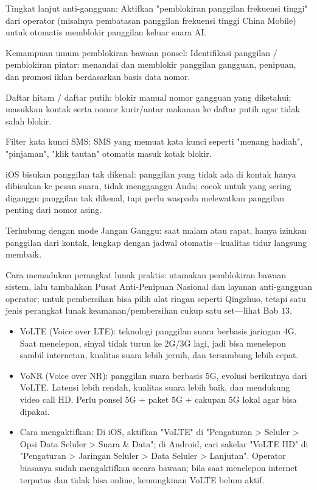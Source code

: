Tingkat lanjut anti-gangguan: Aktifkan "pemblokiran panggilan frekuensi tinggi" dari operator (misalnya pembatasan panggilan frekuensi tinggi China Mobile) untuk otomatis memblokir panggilan keluar suara AI.

Kemampuan umum pemblokiran bawaan ponsel: Identifikasi panggilan / pemblokiran pintar: menandai dan memblokir panggilan gangguan, penipuan, dan promosi iklan berdasarkan basis data nomor.

Daftar hitam / daftar putih: blokir manual nomor gangguan yang diketahui; masukkan kontak serta nomor kurir/antar makanan ke daftar putih agar tidak salah blokir.

Filter kata kunci SMS: SMS yang memuat kata kunci seperti "menang hadiah", "pinjaman", "klik tautan" otomatis masuk kotak blokir.

iOS bisukan panggilan tak dikenal: panggilan yang tidak ada di kontak hanya dibisukan ke pesan suara, tidak mengganggu Anda; cocok untuk yang sering diganggu panggilan tak dikenal, tapi perlu waspada melewatkan panggilan penting dari nomor asing.

Terhubung dengan mode Jangan Ganggu: saat malam atau rapat, hanya izinkan panggilan dari kontak, lengkap dengan jadwal otomatis—kualitas tidur langsung membaik.

Cara memadukan perangkat lunak praktis: utamakan pemblokiran bawaan sistem, lalu tambahkan Pusat Anti-Penipuan Nasional dan layanan anti-gangguan operator; untuk pembersihan bisa pilih alat ringan seperti Qingzhuo, tetapi satu jenis perangkat lunak keamanan/pembersihan cukup satu set—lihat Bab 13.


\begin{itemize}
  \item VoLTE (Voice over LTE): teknologi panggilan suara berbasis jaringan 4G. Saat menelepon, sinyal tidak turun ke 2G/3G lagi, jadi bisa menelepon sambil internetan, kualitas suara lebih jernih, dan tersambung lebih cepat.
  \item VoNR (Voice over NR): panggilan suara berbasis 5G, evolusi berikutnya dari VoLTE. Latensi lebih rendah, kualitas suara lebih baik, dan mendukung video call HD. Perlu ponsel 5G + paket 5G + cakupan 5G lokal agar bisa dipakai.
  \item Cara mengaktifkan: Di iOS, aktifkan "VoLTE" di "Pengaturan > Seluler > Opsi Data Seluler > Suara \& Data"; di Android, cari sakelar "VoLTE HD" di "Pengaturan > Jaringan Seluler > Data Seluler > Lanjutan". Operator biasanya sudah mengaktifkan secara bawaan; bila saat menelepon internet terputus dan tidak bisa online, kemungkinan VoLTE belum aktif.
\end{itemize}


